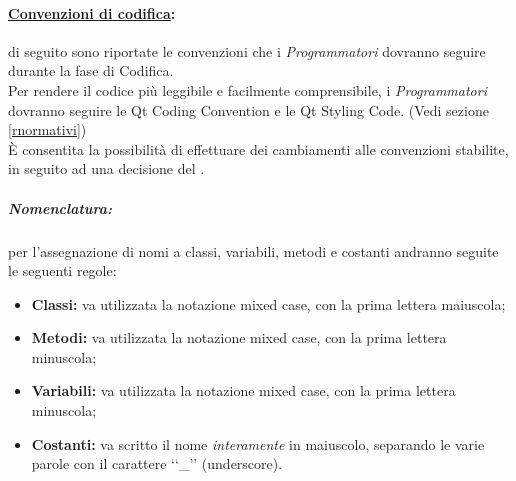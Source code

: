 \paragraph{\underline{Convenzioni di codifica}:} di seguito sono riportate le convenzioni che i \emph{Programmatori} dovranno seguire durante la fase di Codifica.\\
Per rendere il codice più leggibile e facilmente comprensibile, i \emph{Programmatori} dovranno seguire le Qt\g{} Coding Convention e le Qt\g{} Styling Code. (Vedi sezione \ref{rnormativi})\\
È consentita la possibilità di effettuare dei cambiamenti alle convenzioni stabilite, in seguito ad una decisione del \projectManager{}. 

\subparagraph{Nomenclatura:}
\label{nomenclatura}
per l'assegnazione di nomi a classi, variabili, metodi e costanti andranno seguite le seguenti regole:
\begin{itemize}
\item\textbf{Classi:} va utilizzata la notazione mixed case, con la prima lettera maiuscola;
\item\textbf{Metodi:} va utilizzata la notazione mixed case, con la prima lettera minuscola;
\item\textbf{Variabili:} va utilizzata la notazione mixed case, con la prima lettera minuscola;
\item\textbf{Costanti:} va scritto il nome \textit{interamente} in maiuscolo, separando le varie parole con il carattere \lq\lq{}\_\rq\rq{} (underscore).
\end{itemize}

